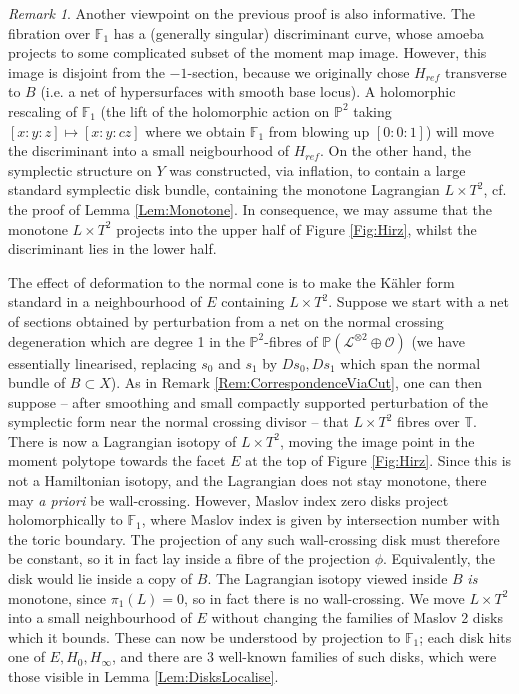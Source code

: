 \documentclass[reqno,10pt]{amsart}
\numberwithin{equation}{section}
\newcommand{\bF}{{\mathbb F}}
\newcommand{\bP}{{\mathbb P}}
\newcommand{\bT}{{\mathbb T}}
\theoremstyle{remark}
\newtheorem{Remark}[thm]{Remark}
\begin{document}
\begin{Remark}
Another viewpoint on the previous proof is also informative. The fibration over $\bF_1$ has a (generally singular) discriminant curve, whose amoeba projects to some complicated subset of the moment map image.  However, this image is disjoint from the $-1$-section, because we originally chose $H_{ref}$ transverse to $B$ (i.e. a net of hypersurfaces with smooth base locus).  A holomorphic rescaling of $\bF_1$ (the lift of the holomorphic action on $\bP^2$ taking $[x:y:z] \mapsto [x:y:cz]$ where we obtain $\bF_1$ from blowing up $[0:0:1]$) will move the discriminant into a small neigbourhood of $H_{ref}$.  On the other hand, the symplectic structure on $Y$ was constructed, via inflation, to contain a large standard symplectic disk bundle, containing the monotone Lagrangian $L\times T^2$, cf. the proof of  Lemma \ref{Lem:Monotone}.  
In consequence, we may assume that the monotone $L\times T^2$ projects into the upper half of Figure \ref{Fig:Hirz}, whilst the discriminant lies in the lower half.  

The effect of deformation to the normal cone is to make the K\"ahler form standard in a neighbourhood of $E$ containing $L\times T^2$.   Suppose we start with a net of sections obtained by perturbation from a net on the normal crossing degeneration which are degree 1 in the $\bP^2$-fibres of $\bP(\mathcal{L}^{\otimes 2}\oplus\mathcal{O})$ (we have essentially linearised, replacing $s_0$ and $s_1$ by $Ds_0, Ds_1$ which span the normal bundle of $B \subset X$).  As in Remark \ref{Rem:CorrespondenceViaCut}, one can then suppose -- after smoothing and small compactly supported perturbation of the symplectic form near the normal crossing divisor -- that $L\times T^2$ fibres over $\bT$.  There is now a  Lagrangian isotopy of $L\times T^2$,  moving the image point in the moment polytope towards the facet $E$ at the top of Figure \ref{Fig:Hirz}. Since this is not a Hamiltonian isotopy, and the Lagrangian does not stay monotone, there may \emph{a priori} be wall-crossing. However,  Maslov index zero disks  project holomorphically to $\bF_1$, where Maslov index is given by intersection number with the toric boundary.  The projection of any such wall-crossing disk must therefore be constant, so it in fact lay inside a fibre of the projection $\phi$.  Equivalently, the disk would lie inside a copy of $B$.  The Lagrangian isotopy viewed inside $B$ \emph{is} monotone, since $\pi_1(L)=0$, so in fact there is no wall-crossing.  We move $L\times T^2$ into a small neighbourhood of $E$ without changing the families of Maslov 2 disks which it bounds.  These can now be understood by projection to $\bF_1$; each disk hits one of $E, H_0, H_{\infty}$, and there are 3 well-known families of such disks, which were those visible in Lemma \ref{Lem:DisksLocalise}. \end{Remark}
\end{document}
